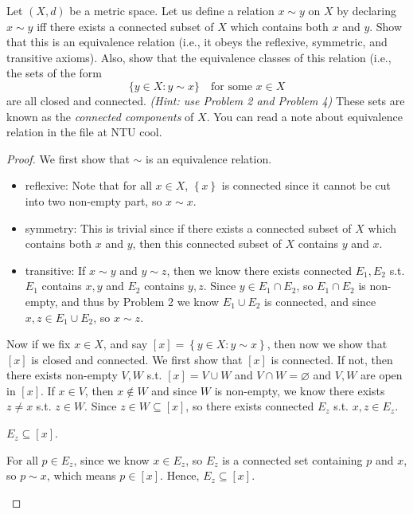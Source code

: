 \begin{problem}[20pts]
    Let $(X,d)$ be a metric space. Let us define a relation $x \sim y$ on $X$ by declaring  
$x \sim y$ iff there exists a connected subset of $X$ which contains both $x$ and $y$.  
Show that this is an equivalence relation (i.e., it obeys the reflexive, symmetric, and transitive axioms).  
Also, show that the equivalence classes of this relation (i.e., the sets of the form  
\[
\{ y \in X : y \sim x \} \quad \text{for some } x \in X
\]  
are all closed and connected.  
\emph{(Hint: use Problem 2 and Problem 4)}  
These sets are known as the \emph{connected components} of $X$.
You can read a note about equivalence relation in the file at NTU cool.
\end{problem}
\begin{proof}
    We first show that \(\sim \) is an equivalence relation. 
    \begin{itemize}
        \item reflexive: Note that for all \(x \in X\), \(\left\{ x \right\} \) is connected since it cannot be cut into two non-empty part, so \(x \sim x\). 
        \item symmetry: This is trivial since if there exists a connected subset of \(X\) which contains both \(x\) and \(y\), then this connected subset of \(X\) contains \(y\) and \(x\). 
        \item transitive: If \(x \sim y\) and \(y \sim z\), then we know there exists connected \(E_1, E_2\) s.t. \(E_1\) contains \(x, y\) and \(E_2\) contains \(y, z\). Since \(y \in E_1 \cap E_2\), so \(E_1 \cap E_2\) is non-empty, and thus by Problem 2 we know \(E_1 \cup E_2\) is connected, and since \(x, z \in E_1 \cup E_2\), so \(x \sim z\).                      
    \end{itemize} 
    Now if we fix \(x \in X\), and say \([x] = \left\{ y \in X: y \sim x \right\} \), then now we show that \([x]\) is closed and connected. We first show that \([x]\) is connected. If not, then there exists non-empty \(V, W\) s.t. \([x] = V \cup W\) and \(V \cap W = \varnothing \) and \(V, W\) are open in \([x]\). If \(x \in V\), then \(x \notin W\) and since \(W\) is non-empty, we know there exists \(z \neq x\) s.t. \(z \in W\). Since \(z \in W \subseteq [x]\), so there exists connected \(E_z\) s.t. \(x, z \in E_z\). 
    \begin{claim}
        \(E_z \subseteq [x]\). 
    \end{claim}              
    \begin{explanation}
        For all \(p \in E_z\), since we know \(x \in E_z\), so \(E_z\) is a connected set containing \(p\) and \(x\), so \(p \sim x\), which means \(p \in [x]\). Hence, \(E_z \subseteq [x]\).         

\end{explanation}
\end{proof}
